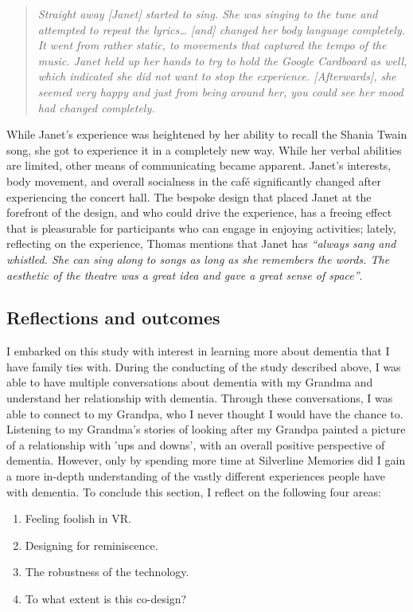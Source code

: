 \begin{quote}
\textit{Straight away [Janet] started to sing. She was singing to the tune and attempted to repeat the lyrics… [and] changed her body language completely. It went from rather static, to movements that captured the tempo of the music. Janet held up her hands to try to hold the Google Cardboard as well, which indicated she did not want to stop the experience. [Afterwards], she seemed very happy and just from being around her, you could see her mood had changed completely.}    
\end{quote}

While Janet’s experience was heightened by her ability to recall the Shania Twain song, she got to experience it in a completely new way. While her verbal abilities are limited, other means of communicating became apparent. Janet’s interests, body movement, and overall socialness in the café significantly changed after experiencing the concert hall. The bespoke design that placed Janet at the forefront of the design, and who could drive the experience, has a freeing effect that is pleasurable for participants who can engage in enjoying activities; lately, reflecting on the experience, Thomas mentions that Janet has \textit{``always sang and whistled. She can sing along to songs as long as she remembers the words. The aesthetic of the theatre was a great idea and gave a great sense of space''}.

\subsection{Reflections and outcomes}
\label{S1:ReflectionsOutcomes}
I embarked on this study with interest in learning more about dementia that I have family ties with. During the conducting of the study described above, I was able to have multiple conversations about dementia with my Grandma and understand her relationship with dementia. Through these conversations, I was able to connect to my Grandpa, who I never thought I would have the chance to. Listening to my Grandma's stories of looking after my Grandpa painted a picture of a relationship with 'ups and downs', with an overall positive perspective of dementia. However, only by spending more time at Silverline Memories did I gain a more in-depth understanding of the vastly different experiences people have with dementia. To conclude this section, I reflect on the following four areas:
\begin{enumerate}
    \item Feeling foolish in VR.
    \item Designing for reminiscence.
    \item The robustness of the technology.
    \item To what extent is this co-design?
\end{enumerate}

